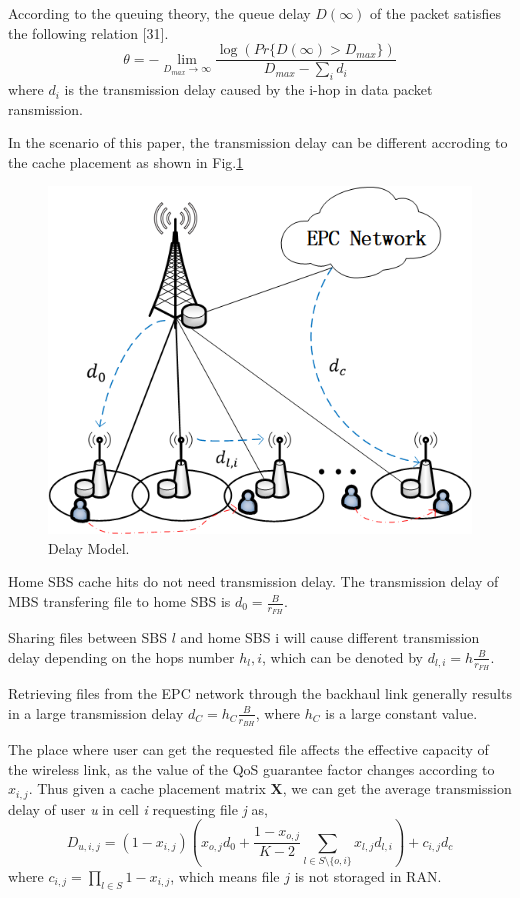 \documentclass[conference]{IEEEtran}
\begin{document}
According to the queuing theory, the queue delay $D(\infty)$ of the packet satisfies the following relation [31].
\begin{equation}
\theta=-\lim_{D_{max}\to \infty}\frac{\log(Pr\{D(\infty)>D_{max}\})}{D_{max}-\sum_i d_i}
\end{equation}
where $d_i$ is the transmission delay caused by the i-hop in data packet ransmission.

In the scenario of this paper, the transmission delay can be different accroding to the cache placement as shown in Fig.\ref{fig 2}
\begin{figure}[htbp]
 \centerline{\includegraphics[scale=0.5]{fig2.png}}
 \caption{Delay Model.}
 \label{fig 2}
\end{figure}

Home SBS cache hits do not need transmission delay. The transmission delay of MBS transfering file to home SBS is $d_0=\frac{B}{r_{FH}}$.

 Sharing files between SBS $l$ and home SBS i will cause different transmission delay depending on the hops number $h_l,i$, which can be denoted by $d_{l,i}=h\frac{B}{r_{FH}}$.

Retrieving files from the EPC network through the backhaul link generally results in a large transmission delay $d_C=h_C\frac{B}{r_{BH}}$, where $h_C$ is a large constant value.

The place where user can get the requested file affects the effective capacity of the wireless link, as the value of the QoS guarantee factor changes according to $x_{i,j}$. Thus given a cache placement matrix $\mathbf{X}$, we can get the average transmission delay of user \emph{u} in cell \emph{i} requesting file \emph{j} as,
\begin{equation}
D_{u,i,j}=(1-x_{i,j})(x_{o,j}d_0+\frac{1-x_{o,j}}{K-2}\sum_{l\in S\setminus{\{o,i\}}}x_{l,j}d_{l,i})+c_{i,j}d_c
\end{equation}
where $c_{i,j}= \prod_{l\in S}1-x_{i,j}$, which means file $j$ is not storaged in RAN.
\end{document}
